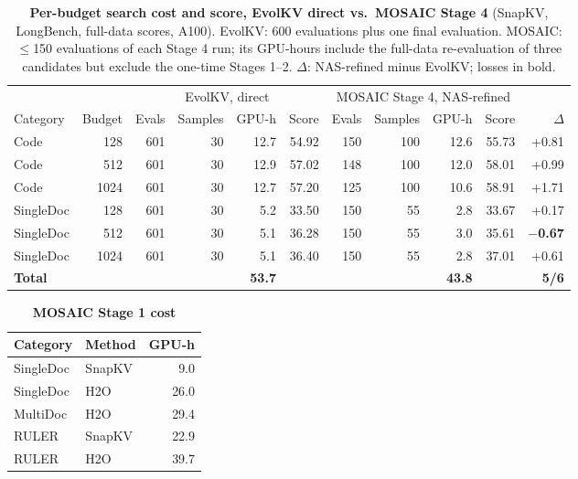 \begin{table}[t]
  \centering
  \footnotesize
  \setlength{\tabcolsep}{4pt}
  \begin{tabular}{@{}l r r r r r r r r r r@{}}
    \toprule
    & & \multicolumn{4}{c}{EvolKV, direct} & \multicolumn{4}{c}{MOSAIC Stage 4, NAS-refined} & \\ \cmidrule(lr){3-6}\cmidrule(lr){7-10}
    Category & Budget & Evals & Samples & GPU-h & Score & Evals & Samples & GPU-h & Score & $\Delta$ \\
    \midrule
    Code & 128 & 601 & 30 & 12.7 & 54.92 & 150 & 100 & 12.6 & 55.73 & +0.81 \\
    Code & 512 & 601 & 30 & 12.9 & 57.02 & 148 & 100 & 12.0 & 58.01 & +0.99 \\
    Code & 1024 & 601 & 30 & 12.7 & 57.20 & 125 & 100 & 10.6 & 58.91 & +1.71 \\
    SingleDoc & 128 & 601 & 30 & 5.2 & 33.50 & 150 & 55 & 2.8 & 33.67 & +0.17 \\
    SingleDoc & 512 & 601 & 30 & 5.1 & 36.28 & 150 & 55 & 3.0 & 35.61 & \textbf{$-$0.67} \\
    SingleDoc & 1024 & 601 & 30 & 5.1 & 36.40 & 150 & 55 & 2.8 & 37.01 & +0.61 \\
    \textbf{Total} &  &  &  & \textbf{53.7} &  &  &  & \textbf{43.8} &  & \textbf{5/6} \\
    \bottomrule
  \end{tabular}
  \caption{\textbf{Per-budget search cost and score, EvolKV direct vs.\ MOSAIC Stage 4} (SnapKV, LongBench, full-data scores, A100). EvolKV: 600 evaluations plus one final evaluation. MOSAIC: $\leq$150 evaluations of each Stage 4 run; its GPU-hours include the full-data re-evaluation of three candidates but exclude the one-time Stages 1--2. $\Delta$: NAS-refined minus EvolKV; losses in bold.}
  \label{tab:app-cost}
\end{table}

\begin{table}[t]
  \centering
  \footnotesize
  \setlength{\tabcolsep}{4pt}
  \begin{tabular}{@{}l l r@{}}
    \toprule
    Category & Method & GPU-h \\
    \midrule
    SingleDoc & SnapKV & 9.0 \\
    SingleDoc & H2O & 26.0 \\
    MultiDoc & H2O & 29.4 \\
    RULER & SnapKV & 22.9 \\
    RULER & H2O & 39.7 \\
    \bottomrule
  \end{tabular}
  \caption{\textbf{MOSAIC Stage 1 cost}}
  \label{tab:app-step1}
\end{table}


